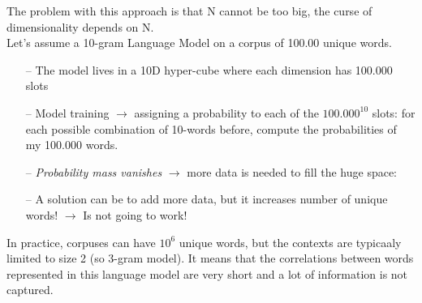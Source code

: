 


The problem with this approach is that N cannot be too big, the curse of dimensionality depends on N. \\
Let's assume a 10-gram Language Model on a corpus of 100.00 unique words. 
\begin{itemize}
    \item[--] The model lives in a 10D hyper-cube where each dimension has 100.000 slots
    \item[--] Model training $\rightarrow$ assigning a probability to each of the $100.000^{10}$ slots: for each possible combination of 10-words before, compute the probabilities of my 100.000 words.
    \item[--] \textit{Probability mass vanishes} $\rightarrow$ more data is needed to fill the huge space:
    \item[--] A solution can be to add more data, but it increases number of unique words! $\rightarrow$ Is not going to work!
\end{itemize}{}
In practice, corpuses can have $10^6$ unique words, but the contexts are typicaaly limited to size 2 (so 3-gram model). It means that the correlations between words represented in this language model are very short and a lot of information is not captured. \\


